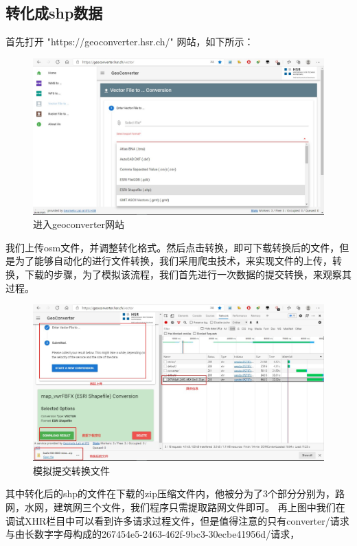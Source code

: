 \subsection{转化成shp数据}
首先打开 "https://geoconverter.hsr.ch/" 网站，如下所示：\\
\begin{figure}[H]
    \centering
    \includegraphics[width=13cm]{figure/shp_1.jpg}
    \caption{进入geoconverter网站}
    \label{fig-geo}
\end{figure}
我们上传osm文件，并调整转化格式。然后点击转换，即可下载转换后的文件，但是为了能够自动化的进行文件转换，我们采用爬虫技术，来实现文件的上传，转换，下载的步骤，为了模拟该流程，我们首先进行一次数据的提交转换，来观察其过程。\\
\begin{figure}[H]
    \centering
    \includegraphics[width=13cm]{figure/shp_2.jpg}
    \caption{模拟提交转换文件}
    \label{fig-mntj}%
\end{figure}
其中转化后的shp的文件在下载的zip压缩文件内，他被分为了3个部分分别为，路网，水网，建筑网三个文件，我们程序只需提取路网文件即可。
再上图中我们在调试XHR栏目中可以看到许多请求过程文件，但是值得注意的只有converter/请求与由长数字字母构成的267454e5-2463-462f-9bc3-30ecbe41956d/请求，
